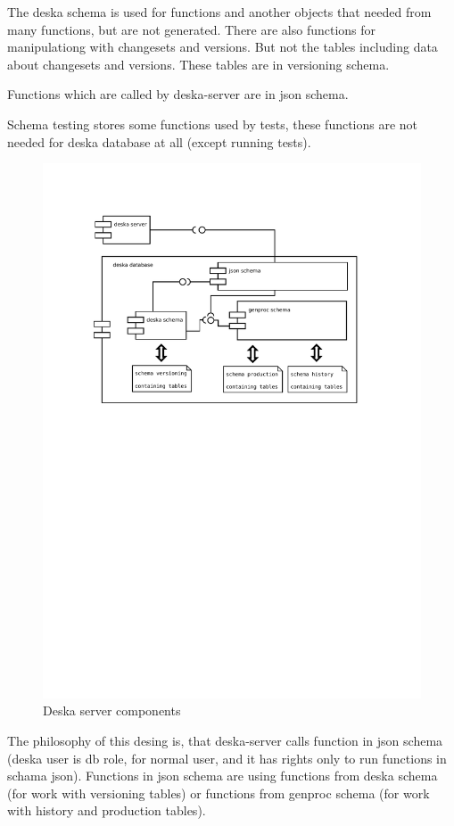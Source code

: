 \documentclass[deska]{subfiles}
\begin{document}
The deska schema is used for functions and another objects that needed from many functions, but are not generated. There are also functions for manipulationg with changesets and versions.
But not the tables including data about changesets and versions. These tables are in versioning schema.

Functions which are called by deska-server are in json schema.

Schema testing stores some functions used by tests, these functions are not needed for deska database at all (except running tests).
\begin{figure}[h]
	\centering
	\includegraphics[trim=28mm 170mm 30mm 28mm]{img-deska-server-components.pdf}
	\caption{Deska server components}
\end{figure}

The philosophy of this desing is, that deska-server calls function in json schema (deska user is db role, for normal user, and it has rights only to run functions in schama json). Functions in json schema are using functions from deska schema (for work with versioning tables) or functions from genproc schema (for work with history and production tables).
\end{document}
